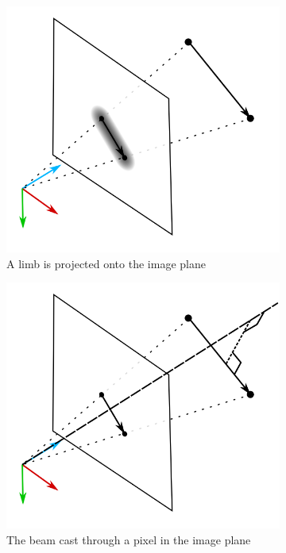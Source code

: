 \begin{figure}
  \begin{subfigure}{.5\textwidth}
    \centering
    \includegraphics[width=\linewidth]{img/projection}
    \caption[Projection]{A limb is projected onto the image plane}
    \label{fig:projection}
  \end{subfigure}
  \begin{subfigure}{.5\textwidth}
    \centering
    \includegraphics[width=\linewidth]{img/closest_points}
    \caption[Beam]{The beam cast through a pixel in the image plane}
    \label{fig:projection}
  \end{subfigure}
  \caption{}
  
\end{figure}


